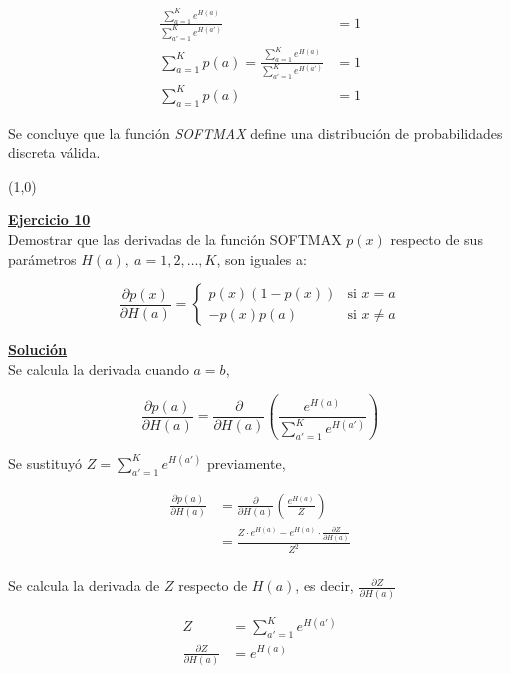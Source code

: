 \documentclass[12pt]{article}
\newlength\tindent
\renewcommand{\indent}{\hspace*{\tindent}}
\begin{document}
    \begin{align*}
        \frac{ \sum_{a=1}^{K} e^{H(a)} } {\sum_{a'=1}^{K} e^{H(a')}} &= 1 \\
        \sum_{a=1}^{K} p(a) = \frac{ \sum_{a=1}^{K} e^{H(a)} } {\sum_{a'=1}^{K} e^{H(a')}} &= 1\\
        \sum_{a=1}^{K} p(a) &= 1
    \end{align*}

    Se concluye que la función \textit{SOFTMAX} define una distribución de probabilidades discreta válida.

    \line(1,0){\textwidth}

    \indent\underline{\textbf{Ejercicio 10}}\\
    Demostrar que las derivadas de la función SOFTMAX $p(x)$ respecto de sus parámetros $H(a),\ a=1,2,\dots,K$, son iguales a:

    \[
        \frac{\partial p(x)}{\partial H(a)} =
        \begin{cases}
            p(x)(1-p(x))    &\text{si $x = a$} \\
            -p(x)p(a)       &\text{si $x\neq a$}
        \end{cases}
    \]

    \indent\underline{\textbf{Solución}}\\
    Se calcula la derivada cuando $a=b$,

    \[
        \frac{\partial p(a)}{\partial H(a)} = \frac{\partial}{\partial H(a)} \left( \frac{e^{H(a)}}{\sum_{a'=1}^{K} e^{H(a')}} \right)
    \]

    Se sustituyó $Z=\sum_{a'=1}^{K} e^{H(a')}$ previamente,

    \begin{align*}
        \frac{\partial p(a)}{\partial H(a)} &= \frac{\partial}{\partial H(a)} \left( \frac{e^{H(a)}}{Z} \right) \\
        &= \frac{Z\cdot e^{H(a)} - e^{H(a)}\cdot \frac{\partial Z}{\partial H(a)}}{Z^2} \\
    \end{align*}

    Se calcula la derivada de $Z$ respecto de $H(a)$, es decir, $\frac{\partial Z}{\partial H(a)}$

    \begin{align*}
        Z &= \sum_{a'=1}^{K} e^{H(a')} \\
        \frac{\partial Z}{\partial H(a)} &= e^{H(a)}
    \end{align*}
\end{document}
